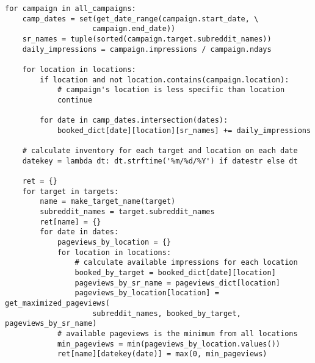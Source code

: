 \documentclass[11pt, a4paper]{article}
\begin{document}
\hrulefill
\begin{lstlisting}[caption=3-for-loops power]
for campaign in all_campaigns:
    camp_dates = set(get_date_range(campaign.start_date, \
					campaign.end_date))
    sr_names = tuple(sorted(campaign.target.subreddit_names))
    daily_impressions = campaign.impressions / campaign.ndays

    for location in locations:
        if location and not location.contains(campaign.location):
            # campaign's location is less specific than location
            continue

        for date in camp_dates.intersection(dates):
            booked_dict[date][location][sr_names] += daily_impressions

    # calculate inventory for each target and location on each date
    datekey = lambda dt: dt.strftime('%m/%d/%Y') if datestr else dt

    ret = {}
    for target in targets:
        name = make_target_name(target)
        subreddit_names = target.subreddit_names
        ret[name] = {}
        for date in dates:
            pageviews_by_location = {}
            for location in locations:
                # calculate available impressions for each location
                booked_by_target = booked_dict[date][location]
                pageviews_by_sr_name = pageviews_dict[location]
                pageviews_by_location[location] = get_maximized_pageviews(
                    subreddit_names, booked_by_target, pageviews_by_sr_name)
            # available pageviews is the minimum from all locations
            min_pageviews = min(pageviews_by_location.values())
            ret[name][datekey(date)] = max(0, min_pageviews)
\end{lstlisting}
\hrulefill
\hrulefill
\end{document}
